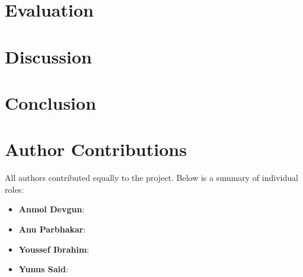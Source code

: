 \documentclass[conference]{IEEEtran}
\begin{document}
\section{Evaluation}

\section{Discussion}

\section{Conclusion}

\section*{Author Contributions}

All authors contributed equally to the project. Below is a summary of individual roles:

\begin{itemize}
    \item \textbf{Anmol Devgun}: 
    \item \textbf{Anu Parbhakar}: 
    \item \textbf{Youssef Ibrahim}: 
    \item \textbf{Yunus Said}: 
\end{itemize}




\end{document}
